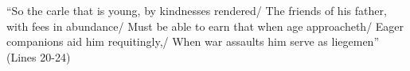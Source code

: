 \documentclass[11 pt, twoside]{article}
\begin{document}
\pagestyle{fancy}

\begin{multicols}{2}
``So the carle that is young, by kindnesses rendered/ The friends of his father, with fees in abundance/ Must be able to earn that when age approacheth/ Eager companions aid him requitingly,/ When war assaults him serve as liegemen'' (Lines 20-24)
\columnbreak

\end{multicols}
\end{document}
